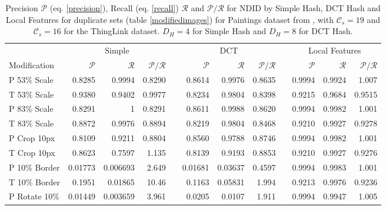 \documentclass[english,12pt,a4paper,pdftex,elec,utf8]{aaltothesis}
\begin{document}
\clearpage
\begin{table} \footnotesize
\caption{ Precision $\mathcal{P}$ (eq. \ref{precision}), Recall (eq. \ref{recall}) $\mathcal{R}$ and $\mathcal{P}/\mathcal{R}$ for NDID by Simple Hash, DCT Hash and Local Features for duplicate sets (table \ref{modifiedimages}) for Paintings dataset from \cite{Vedaldi2012}, with $\mathcal{C}_s = 19$ and $\mathcal{C}_s = 16$ for the ThingLink dataset. $D_H = 4$ for Simple Hash and $D_H = 8$ for DCT Hash.}
\label{precisionrecall}
\begin{center}
  \setlength\tabcolsep{3pt} %
  \begin{tabular}{@{}lrrrrrrrrrrr@{}}
    \toprule
    & \multicolumn{3}{c}{Simple} &\phantom{abc} &\multicolumn{3}{c}{DCT} &\phantom{abc} & \multicolumn{3}{c}{Local Features}\\
\cmidrule{2-4} \cmidrule{6-8} \cmidrule{10-12}
 Modification & $\mathcal{P}$ & $\mathcal{R}$ & $\mathcal{P} / \mathcal{R}$ &\phantom{abc} & $\mathcal{P}$ & $\mathcal{R}$ & $\mathcal{P} / \mathcal{R}$ &\phantom{abc} & $\mathcal{P}$ & $\mathcal{R}$ & $\mathcal{P} / \mathcal{R}$\\ \midrule
 P 53\% Scale   & 0.8285 & 0.9994 & 0.8290 &\phantom{abc} & 0.8614 & 0.9976 & 0.8635 &\phantom{abc} & 0.9994 & 0.9924 & 1.007\\
 T 53\% Scale   & 0.9380 & 0.9402 & 0.9977 &\phantom{abc} & 0.8234 & 0.9804 & 0.8398 &\phantom{abc} & 0.9215 & 0.9684 & 0.9515\\
 P 83\% Scale   & 0.8291 & 1 & 0.8291 &\phantom{abc} & 0.8611 & 0.9988 & 0.8620 &\phantom{abc} & 0.9994 & 0.9982 & 1.001 \\
 T 83\% Scale   & 0.8872 & 0.9976 & 0.8894 &\phantom{abc} & 0.8219 & 0.9804 & 0.8468 &\phantom{abc} & 0.9210 & 0.9927 & 0.9278 \\
 P Crop 10px & 0.8109 & 0.9211 & 0.8804 &\phantom{abc} & 0.8560 & 0.9788 & 0.8746 &\phantom{abc} & 0.9994 & 0.9982 & 1.001 \\
 T Crop 10px    & 0.8623 & 0.7597 & 1.135 &\phantom{abc} & 0.8139 & 0.9193 & 0.8853 &\phantom{abc} & 0.9210 & 0.9927 & 0.9276 \\
 P 10\% Border  & 0.01773 & 0.006693 & 2.649 & \phantom{abc} & 0.01681& 0.03637 & 0.4597 &\phantom{abc} & 0.9994 & 0.9983 & 1.001 \\
 T 10\% Border  & 0.1951 & 0.01865 & 10.46 & \phantom{abc} & 0.1163 & 0.05831 & 1.994 &\phantom{abc} & 0.9213 & 0.9976 & 0.9236 \\
 P Rotate 10\%  & 0.01449 & 0.003659 & 3.961 &\phantom{abc} & 0.0205 & 0.0107 & 1.911 & \phantom{abc} & 0.9994 & 0.9947 & 1.005 \\

\end{tabular}
\end{center}
\end{table}
\end{document}
